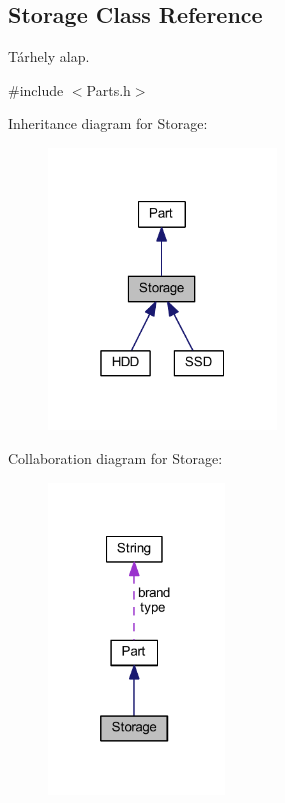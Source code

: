 \hypertarget{class_storage}{}\subsection{Storage Class Reference}
\label{class_storage}


Tárhely alap.  




{\ttfamily \#include $<$Parts.\+h$>$}



Inheritance diagram for Storage\+:
\nopagebreak
\begin{figure}[H]
\begin{center}
\leavevmode
\includegraphics[width=172pt]{class_storage__inherit__graph}
\end{center}
\end{figure}


Collaboration diagram for Storage\+:
\nopagebreak
\begin{figure}[H]
\begin{center}
\leavevmode
\includegraphics[width=133pt]{class_storage__coll__graph}
\end{center}
\end{figure}
